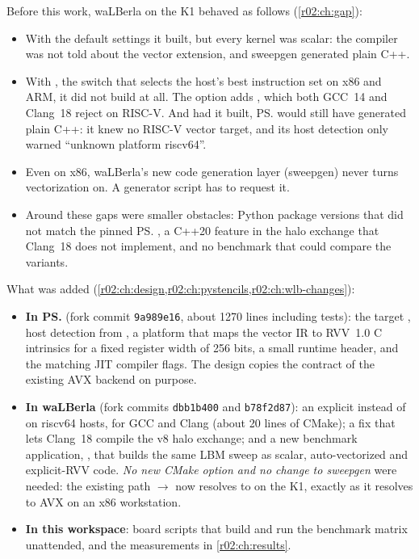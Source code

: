 Before this work, waLBerla on the K1 behaved as follows (\cref{r02:ch:gap}):
\begin{itemize}
  \item With the default settings it built, but every kernel was scalar: the compiler
        was not told about the vector extension, and sweepgen generated plain C++.
  \item With , the switch that selects
        the host's best instruction set on x86 and ARM, it did not build at all. The
        option adds , which both GCC~14 and Clang~18 reject on
        RISC-V. And had it built, \ps{} would still have generated plain C++: it knew no
        RISC-V vector target, and its host detection only warned ``unknown platform
        riscv64''.
  \item Even on x86, waLBerla's new code generation layer (sweepgen) never turns
        vectorization on. A generator script has to request it.
  \item Around these gaps were smaller obstacles: Python package versions that did not
        match the pinned \ps{}, a C++20 feature in the halo exchange that Clang~18 does
        not implement, and no benchmark that could compare the variants.
\end{itemize}

What was added (\cref{r02:ch:design,r02:ch:pystencils,r02:ch:wlb-changes}):
\begin{itemize}
  \item \textbf{In \ps{}} (fork commit \texttt{9a989e16}, about 1270 lines including
        tests): the target , host detection from
        , a platform that maps the vector IR to RVV~1.0 C intrinsics
        for a fixed register width of 256 bits, a small runtime header, and the matching
        JIT compiler flags. The design copies the contract of the existing AVX backend
        on purpose.
  \item \textbf{In waLBerla} (fork commits \texttt{dbb1b400} and \texttt{b78f2d87}): an
        explicit  instead of  on
        riscv64 hosts, for GCC and Clang (about 20 lines of CMake); a fix that lets Clang~18
        compile the v8 halo exchange; and a new benchmark application,
        , that builds the same LBM sweep as
        scalar, auto-vectorized and explicit-RVV code. \emph{No new CMake option and no
        change to sweepgen} were needed: the existing path
         $\rightarrow$ 
        now resolves to  on the K1, exactly as it resolves to AVX on
        an x86 workstation.
  \item \textbf{In this workspace}: board scripts that build and run the benchmark
        matrix unattended, and the measurements in \cref{r02:ch:results}.
\end{itemize}

